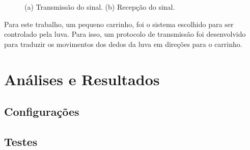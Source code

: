 \documentclass[
	12pt,				%
	openright,			%
	oneside,			%
	a4paper,			%
	english,			%
	brazil				%
	]{abntex2}
\begin{document}
	\begin{figure}[!htb]
  	\centering
   	\caption{ (a) Transmissão do sinal. (b) Recepção do sinal.}
   	\centering
   	\label{Fig:transmitter-and-receptor}
 		\end{figure}


			Para este trabalho, um pequeno carrinho, foi o sistema escolhido para ser controlado pela luva. Para isso, um protocolo de transmissão foi desenvolvido para traduzir os movimentos dos dedos da luva em direções para o carrinho.


	
		
		

	
	\chapter{Análises e Resultados}

		\section{Configurações}

		\section{Testes}
\end{document}
